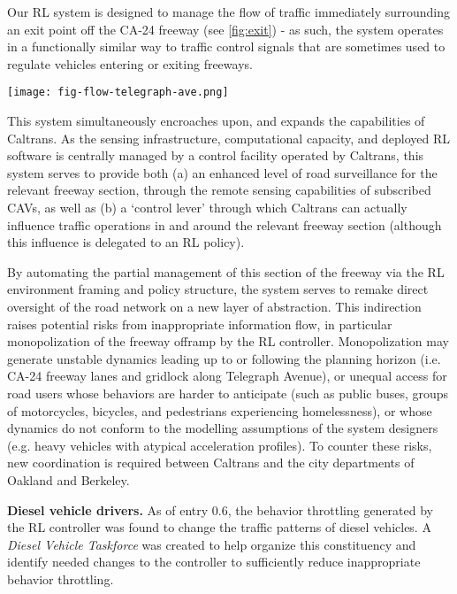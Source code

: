 \documentclass[12pt, a4paper, twocolumn]{article}
\newenvironment{Figure}
  {\par\medskip\noindent\minipage{\linewidth}}
  {\endminipage\par\medskip}
\begin{document}
\begin{multicols}{2}
{Our RL system is designed to manage the flow of traffic immediately surrounding an exit point off the CA-24 freeway (see \cref{fig:exit}) - as such, the system operates in a functionally similar way to traffic control signals that are sometimes used to regulate vehicles entering or exiting freeways.

\begin{Figure}
    \centering
    \texttt{[image: fig-flow-telegraph-ave.png]}
    \label{fig:exit}
\end{Figure}

This system simultaneously encroaches upon, and expands the capabilities of Caltrans.
As the sensing infrastructure, computational capacity, and deployed RL software is centrally managed by a control facility operated by Caltrans, this system serves to provide both (a) an enhanced level of road surveillance for the relevant freeway section, through the remote sensing capabilities of subscribed CAVs, as well as (b) a `control lever' through which Caltrans can actually influence traffic operations in and around the relevant freeway section (although this influence is delegated to an RL policy).

}{%

By automating the partial management of this section of the freeway via the RL environment framing and policy structure, the system serves to remake direct oversight of the road network on a new layer of abstraction.
This indirection raises potential risks from inappropriate information flow, in particular monopolization of the freeway offramp by the RL controller.
Monopolization may generate unstable dynamics leading up to or following the planning horizon (i.e. CA-24 freeway lanes and gridlock along Telegraph Avenue), or unequal access for road users whose behaviors are harder to anticipate (such as public buses, groups of motorcycles, bicycles, and pedestrians experiencing homelessness), or whose dynamics do not conform to the modelling assumptions of the system designers (e.g. heavy vehicles with atypical acceleration profiles).
To counter these risks, new coordination is required between Caltrans and the city departments of Oakland and Berkeley.

\textbf{Diesel vehicle drivers.} As of entry 0.6, the behavior throttling generated by the RL controller was found to change the traffic patterns of diesel vehicles.
A \textit{Diesel Vehicle Taskforce} was created to help organize this constituency and identify needed changes to the controller to sufficiently reduce inappropriate behavior throttling.

}
\end{multicols}
\end{document}
